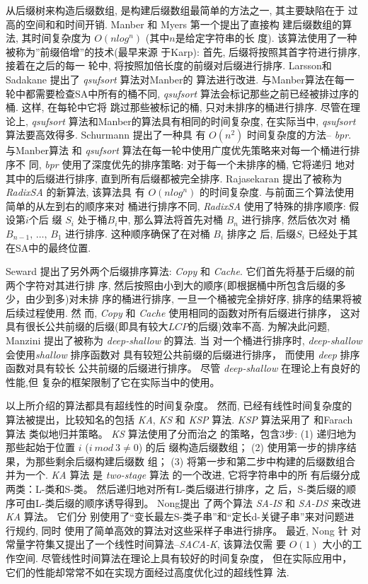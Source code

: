 \documentclass{ws-ijprai}
\begin{document}
从后缀树来构造后缀数组, 是构建后缀数组最简单的方法之一, 其主要缺陷在于
过高的空间和和时间开销. Manber 和 Myers\cite{Manber} 第一个提出了直接构
建后缀数组的算法, 其时间复杂度为 $O(nlog^n)$ (其中$n$是给定字符串的长
度). 该算法使用了一种被称为''前缀倍增''的技术(最早来源
于Karp\cite{Karp}): 首先, 后缀将按照其首字符进行排序, 接着在之后的每一
轮中, 将按照加倍长度的前缀对后缀进行排序.
Larsson和Sadakane\cite{qsufsort} 提出了 \emph{qsufsort} 算法对Manber的
算法进行改进. 与Manber算法在每一轮中都需要检查SA中所有的桶不同,
\emph{qsufsort} 算法会标记那些之前已经被排过序的桶. 这样, 在每轮中它将
跳过那些被标记的桶, 只对未排序的桶进行排序. 尽管在理论上,
\emph{qsufsort} 算法和Manber的算法具有相同的时间复杂度, 在实际当中,
\emph{qsufsort}算法要高效得多. Schurmann\cite{bpr} 提出了一种具
有 $O(n^2)$ 时间复杂度的方法-- \emph{bpr}. 与Manber算法
和 \emph{qsufsort} 算法在每一轮中使用广度优先策略来对每一个桶进行排序不
同, \emph{bpr} 使用了深度优先的排序策略: 对于每一个未排序的桶, 它将递归
地对其中的后缀进行排序, 直到所有后缀都被完全排序.  Rajasekaran
\cite{RadixSA} 提出了被称为 \emph{RadixSA} 的新算法, 该算法具
有 $O(nlog^n)$ 的时间复杂度. 与前面三个算法使用简单的从左到右的顺序来对
桶进行排序不同, \emph{RadixSA} 使用了特殊的排序顺序: 假设第$i$个后
缀 $S_i$ 处于桶$B_i$中, 那么算法将首先对桶 $B_n$ 进行排序, 然后依次对
桶 $B_{n-1},\,\dots,\, B_1$ 进行排序. 这种顺序确保了在对桶 $B_i$ 排序之
后, 后缀$S_i$ 已经处于其在SA中的最终位置.

Seward\cite{Copy_Cache} 提出了另外两个后缀排序算法:
\emph{Copy} 和 \emph{Cache}. 它们首先将基于后缀的前两个字符对其进行排
序, 然后按照由小到大的顺序(即根据桶中所包含后缀的多少，由少到多)对未排
序的桶进行排序, 一旦一个桶被完全排好序, 排序的结果将被后续过程使用. 然
而, \emph{Copy} 和 \emph{Cache} 使用相同的函数对所有后缀进行排序， 这对
具有很长公共前缀的后缀(即具有较大$LCP$的后缀)效率不高. 为解决此问题,
Manzini\cite{deep_shallow} 提出了被称为 \emph{deep-shallow} 的算法. 当
对一个桶进行排序时, \emph{deep-shallow} 会使用\emph{shallow} 排序函数对
具有较短公共前缀的后缀进行排序， 而使用 \emph{deep} 排序函数对具有较长
公共前缀的后缀进行排序。 尽管 \emph{deep-shallow} 在理论上有良好的性能,但
复杂的框架限制了它在实际当中的使用。

以上所介绍的算法都具有超线性的时间复杂度。 然而, 已经有线性时间复杂度的
算法被提出，比较知名的包括 \emph{KA}\cite{KA},
\emph{KS}\cite{KS} 和 \emph{KSP}\cite{KSP} 算法. \emph{KSP} 算法采用了
和Farach算法\cite{Farach} 类似地归并策略。 \emph{KS} 算法使用了分而治之
的策略，包含3步: (1) 递归地为那些起始于位置 $i$ ($i~mod~3 \neq 0$) 的后
缀构造后缀数组； (2) 使用第一步的排序结果，为那些剩余后缀构建后缀数
组； (3) 将第一步和第二步中构建的后缀数组合并为一个. \emph{KA} 算法
是 \emph{two-stage} 算法\cite{two_stages} 的一个改进, 它将字符串中的所
有后缀分成两类：L-类和S-类。 然后递归地对所有L-类后缀进行排序，之
后，S-类后缀的顺序可由L-类后缀的顺序诱导得到。 Nong\cite{SA_IS_DS}提出
了两个算法 \emph{SA-IS} 和 \emph{SA-DS} 来改进 \emph{KA} 算法。 它们分
别使用了“变长最左S-类子串”和“定长d-关键子串”来对问题进行规约, 同时
使用了简单高效的算法对这些采样子串进行排序。 最近, Nong\cite{SACA_K} 针
对常量字符集又提出了一个线性时间算法--\emph{SACA-K}, 该算法仅需
要 $O(1)$ 大小的工作空间. 尽管线性时间算法在理论上具有较好的时间复杂度，
但在实际应用中， 它们的性能却常常不如在实现方面经过高度优化过的超线性算
法\cite{RadixSA}.
\end{document}
